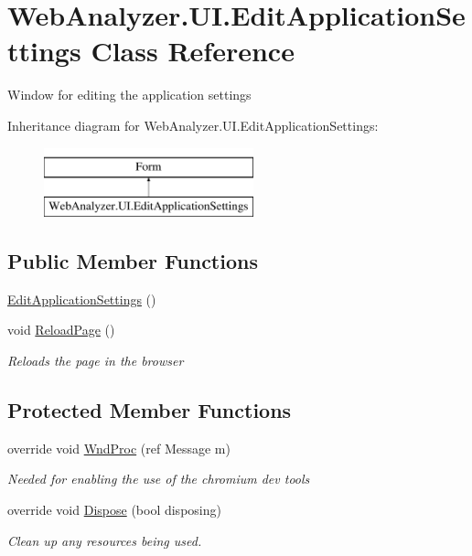 \hypertarget{class_web_analyzer_1_1_u_i_1_1_edit_application_settings}{}\section{Web\+Analyzer.\+U\+I.\+Edit\+Application\+Settings Class Reference}
\label{class_web_analyzer_1_1_u_i_1_1_edit_application_settings}


Window for editing the application settings  


Inheritance diagram for Web\+Analyzer.\+U\+I.\+Edit\+Application\+Settings\+:\begin{figure}[H]
\begin{center}
\leavevmode
\includegraphics[height=2.000000cm]{class_web_analyzer_1_1_u_i_1_1_edit_application_settings}
\end{center}
\end{figure}
\subsection*{Public Member Functions}
\begin{DoxyCompactItemize}
\item 
\hyperlink{class_web_analyzer_1_1_u_i_1_1_edit_application_settings_a4ca4b7a4a61a5145fadec673040b99d2}{Edit\+Application\+Settings} ()
\item 
void \hyperlink{class_web_analyzer_1_1_u_i_1_1_edit_application_settings_a5155f1a4642ae5950d786bc76b4bc857}{Reload\+Page} ()
\begin{DoxyCompactList}\small\item\em Reloads the page in the browser \end{DoxyCompactList}\end{DoxyCompactItemize}
\subsection*{Protected Member Functions}
\begin{DoxyCompactItemize}
\item 
override void \hyperlink{class_web_analyzer_1_1_u_i_1_1_edit_application_settings_a1a386f773bda5cbc4f36637955857912}{Wnd\+Proc} (ref Message m)
\begin{DoxyCompactList}\small\item\em Needed for enabling the use of the chromium dev tools \end{DoxyCompactList}\item 
override void \hyperlink{class_web_analyzer_1_1_u_i_1_1_edit_application_settings_af10f412e0fc3ff84a583a96097196781}{Dispose} (bool disposing)
\begin{DoxyCompactList}\small\item\em Clean up any resources being used. \end{DoxyCompactList}\end{DoxyCompactItemize}
